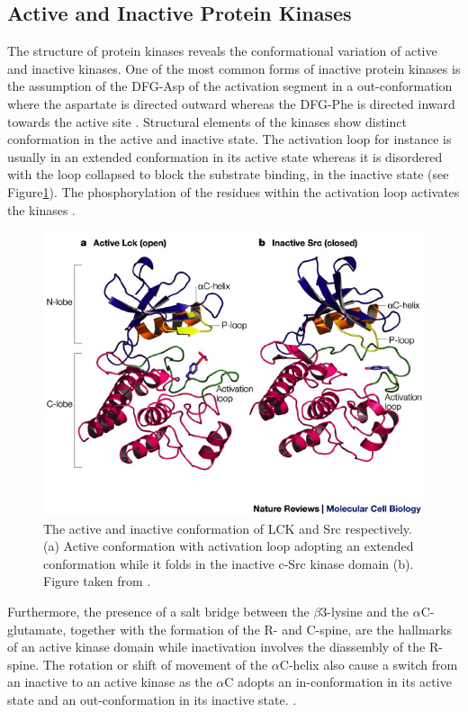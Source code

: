 \documentclass[a4paper, 11pt]{article}
\begin{document}
\subsection*{Active and Inactive Protein Kinases}
\label{sec:kinasereg}
The structure of protein kinases reveals the conformational variation of active and inactive kinases. One of the most common forms of inactive  protein kinases is the assumption of the DFG-Asp of the activation segment in a out-conformation where the aspartate is directed outward whereas the DFG-Phe is directed inward towards the active site \cite{roskoski2016classification}. Structural elements of the kinases show distinct conformation in the active and inactive state. The activation loop for instance is usually in an extended conformation in its active state whereas it is disordered with the loop collapsed to block the substrate binding, in the inactive state (see Figure\ref{kinstruct}). The phosphorylation of the residues within the activation loop activates the kinases \cite{roskoski2016classification}. 
\begin{figure}[H]
	\includegraphics[width=.8\linewidth]{figures/actkin.jpg}
	\centering
	\caption{The active and inactive conformation of LCK and Src respectively. (a) Active conformation with activation loop adopting an extended conformation while it folds in the inactive c-Src kinase domain (b). Figure taken from \cite{hantschel2004regulation}.}
	\label{kinstruct}
\end{figure}
Furthermore, the presence of a salt bridge between the $\beta3$-lysine and the $\alpha$C-glutamate, together with the formation of the R- and C-spine, are the hallmarks of an active kinase domain while inactivation involves the diassembly of the R-spine. The rotation or shift of movement of the $\alpha$C-helix also cause a switch from an inactive to an active kinase as the $\alpha$C adopts an in-conformation in its active state and an out-conformation in its inactive state. \cite{tsai2013molecular,roskoski2016classification}.
\end{document}
